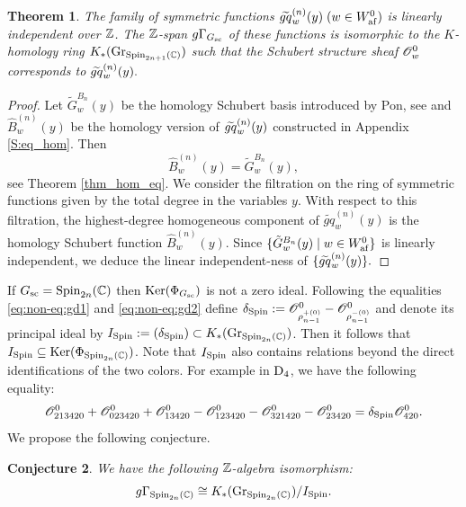 \documentclass[a4paper]{amsart}
\newtheorem{thm}{Theorem}[section]
\newtheorem{conj}[thm]{Conjecture}
\theoremstyle{remark}
\numberwithin{equation}{section}
\begin{document}
\begin{thm} The family of symmetric functions
$\tgq{w}{n}(y)\;(w\in \Wafgr)$ is linearly independent
over $\Z$. The $\Z$-span $g\Gamma_{\Gsc}$ of 
these functions is isomorphic to the
$K$-homology ring $K_*(\Gr_{\Spin_{2n+1}(\C)})$
such that the Schubert structure sheaf $\cO{w}^0$
corresponds to $\tgq{w}{n}(y).$
 \end{thm}
 \begin{proof}
Let $\tilde{G}_w^{B_n}(y)$ be the homology Schubert basis introduced by Pon, see \cite[Section 2.2]{Pon} and ${\widehat{B}}_w^{(n)}(y)$ be the
homology version of $\tgq{w}{n}(y)$ 
constructed in Appendix \ref{S:eq_hom}.
Then 
\begin{equation}
{\widehat{B}}_w^{(n)}(y)=\tilde{G}_w^{B_n}(y),
\end{equation}
see Theorem \ref{thm_hom_eq}. 
We consider the filtration on the ring of symmetric functions
given by the total degree in the variables $y$.
With respect to this filtration, the highest-degree
homogeneous component of $\widetilde{gq}_w^{(n)}(y)$
is the homology Schubert function $\widehat B_w^{(n)}(y)$.
Since $\{\tilde{G}_w^{B_n}(y)\mid w\in \Wafgr\}$ is linearly 
independent, we deduce the linear independent-ness of 
$\{\tgq{w}{n}(y)\}.$
 \end{proof}

If $\Gsc=\Spin_{2n}(\C)$ then $\Ker(\Phi_{\Gsc})$ is not a zero ideal. Following the equalities \eqref{eq:non-eq:gd1} and \eqref{eq:non-eq:gd2} define $\delta_{\Spin}:=\cO{\rho_{n-1}^{+(0)}}^0-\cO{\rho_{n-1}^{-(0)}}^0$ and denote its principal ideal by $I_{\Spin}:=(\delta_{\Spin})\subset K_*(\Gr_{\Spin_{2n}(\C)})$. Then it follows that $I_{\Spin}\subseteq \Ker(\Phi_{\Spin_{2n}(\C)})$.
Note that $I_{\Spin}$ also contains relations beyond the direct identifications of the two colors.  
For example in $\D{4}$, we have the following equality: 
$$\cO{213420}^0 + \cO{023420}^0 + \cO{13420}^0-\cO{123420}^0-\cO{321420}^0-\cO{23420}^0=\delta_{\Spin}\cO{420}^0.$$
We propose the following conjecture.
\begin{conj}\label{conj:D}
    We have the following $\Z$-algebra  isomorphism:
    $$g\Gamma_{\Spin_{2n}(\C)}\cong {K_*(\Gr_{\Spin_{2n}(\C)})}/{I_{\Spin}}.$$
\end{conj}
\end{document}
